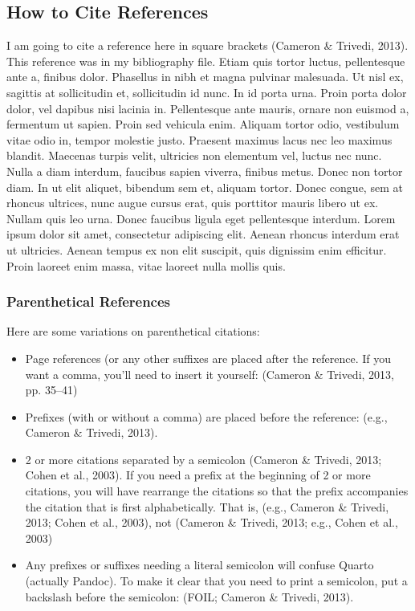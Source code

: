 \documentclass[
  man,
  floatsintext,
  longtable,
  nolmodern,
  notxfonts,
  notimes,
  mask,
  colorlinks=true,linkcolor=blue,citecolor=blue,urlcolor=blue]{apa7}
\begin{document}
\subsection{How to Cite References}\label{how-to-cite-references}

I am going to cite a reference here in square brackets (Cameron \&
Trivedi, 2013). This reference was in my bibliography file. Etiam quis
tortor luctus, pellentesque ante a, finibus dolor. Phasellus in nibh et
magna pulvinar malesuada. Ut nisl ex, sagittis at sollicitudin et,
sollicitudin id nunc. In id porta urna. Proin porta dolor dolor, vel
dapibus nisi lacinia in. Pellentesque ante mauris, ornare non euismod a,
fermentum ut sapien. Proin sed vehicula enim. Aliquam tortor odio,
vestibulum vitae odio in, tempor molestie justo. Praesent maximus lacus
nec leo maximus blandit. Maecenas turpis velit, ultricies non elementum
vel, luctus nec nunc. Nulla a diam interdum, faucibus sapien viverra,
finibus metus. Donec non tortor diam. In ut elit aliquet, bibendum sem
et, aliquam tortor. Donec congue, sem at rhoncus ultrices, nunc augue
cursus erat, quis porttitor mauris libero ut ex. Nullam quis leo urna.
Donec faucibus ligula eget pellentesque interdum. Lorem ipsum dolor sit
amet, consectetur adipiscing elit. Aenean rhoncus interdum erat ut
ultricies. Aenean tempus ex non elit suscipit, quis dignissim enim
efficitur. Proin laoreet enim massa, vitae laoreet nulla mollis quis.

\subsubsection{Parenthetical References}\label{parenthetical-references}

Here are some variations on parenthetical citations:

\begin{itemize}
\item
  Page references (or any other suffixes are placed after the reference.
  If you want a comma, you'll need to insert it yourself: (Cameron \&
  Trivedi, 2013, pp. 35--41)
\item
  Prefixes (with or without a comma) are placed before the reference:
  (e.g., Cameron \& Trivedi, 2013).
\item
  2 or more citations separated by a semicolon (Cameron \& Trivedi,
  2013; Cohen et al., 2003). If you need a prefix at the beginning of 2
  or more citations, you will have rearrange the citations so that the
  prefix accompanies the citation that is first alphabetically. That is,
  (e.g., Cameron \& Trivedi, 2013; Cohen et al., 2003), not (Cameron \&
  Trivedi, 2013; e.g., Cohen et al., 2003)
\item
  Any prefixes or suffixes needing a literal semicolon will confuse
  Quarto (actually Pandoc). To make it clear that you need to print a
  semicolon, put a backslash before the semicolon: (FOIL; Cameron \&
  Trivedi, 2013).
\end{itemize}
\end{document}
